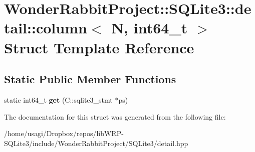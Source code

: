 \hypertarget{structWonderRabbitProject_1_1SQLite3_1_1detail_1_1column_3_01N_00_01int64__t_01_4}{\section{Wonder\-Rabbit\-Project\-:\-:S\-Q\-Lite3\-:\-:detail\-:\-:column$<$ N, int64\-\_\-t $>$ Struct Template Reference}
\label{structWonderRabbitProject_1_1SQLite3_1_1detail_1_1column_3_01N_00_01int64__t_01_4}
}
\subsection*{Static Public Member Functions}
\begin{DoxyCompactItemize}
\item 
\hypertarget{structWonderRabbitProject_1_1SQLite3_1_1detail_1_1column_3_01N_00_01int64__t_01_4_aa39dff2579fd5ae75ecf36f8c32705bd}{static int64\-\_\-t {\bfseries get} (C\-::sqlite3\-\_\-stmt $\ast$ps)}\label{structWonderRabbitProject_1_1SQLite3_1_1detail_1_1column_3_01N_00_01int64__t_01_4_aa39dff2579fd5ae75ecf36f8c32705bd}

\end{DoxyCompactItemize}


The documentation for this struct was generated from the following file\-:\begin{DoxyCompactItemize}
\item 
/home/usagi/\-Dropbox/repos/lib\-W\-R\-P-\/\-S\-Q\-Lite3/include/\-Wonder\-Rabbit\-Project/\-S\-Q\-Lite3/detail.\-hpp\end{DoxyCompactItemize}
